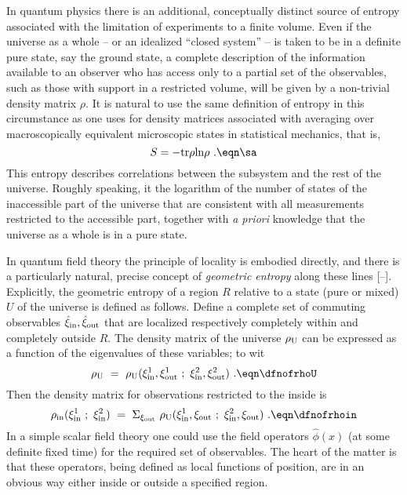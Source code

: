 In quantum physics there is an additional,
conceptually distinct source of entropy
associated with the limitation of experiments to a finite volume.
Even if the universe as a whole -- or an idealized ``closed system'' --
is taken to be in a definite pure
state, say the ground state, a complete description of
the information available
to an observer who has access only to a partial set of the
observables, such as those with support in a restricted volume, will
be given by a non-trivial density matrix $\rho$.  It is natural to
use the same definition of entropy in this circumstance as one uses for
density matrices associated with averaging over macroscopically equivalent
microscopic states in statistical mechanics, that is,
$$
 S = - {\rm tr} \rho {\rm ln} \rho~.
\eqn\sa
$$
This entropy describes correlations
between the subsystem and the rest of the universe.
Roughly speaking, it the logarithm of the number of states
of the inaccessible part of the
universe that are consistent with
all measurements restricted to the accessible part, together
with {\it a priori\/} knowledge that the universe as a whole is in a
pure state.


In quantum field theory the principle of
locality is embodied directly,
and there is a particularly natural, precise
concept of {\it geometric entropy\/} along these
lines [\bombelli --\susskindfour ].
Explicitly, the
geometric entropy of a region $R$ relative to a state (pure or mixed) $U$
of the universe is defined as follows.
Define a complete set of commuting observables
$\hat \xi_{\rm in}, \hat \xi_{\rm out}$
that are  localized respectively
completely within and completely outside $R$.  The density matrix
of the universe $\rho_{\rm U}$ can be expressed as a function of
the eigenvalues of these variables; to wit
$$
\rho_{\rm U} ~=~
\rho_{\rm U} (\xi^1_{\rm in}, \xi^1_{\rm out}~;~
\xi^2_{\rm in}, \xi^2_{\rm out})~.
\eqn\dfnofrhoU
$$
Then the density matrix for observations restricted to the inside
is
$$
\rho_{\rm in} (\xi^1_{\rm in}~;~\xi^2_{\rm in} )~=~
\Sigma_{\xi_{\rm out}}~
\rho_{\rm U} (\xi^1_{\rm in}, \xi_{\rm out}~;~
\xi^2_{\rm in}, \xi_{\rm out})~.
\eqn\dfnofrhoin
$$
In a simple scalar field theory one could use the
field operators $\hat \phi (x)$ (at some definite fixed time)
for the required
set of observables.  The heart of the matter is that these operators,
being
defined as local functions of position, are in an obvious way either
inside or outside a specified region.

